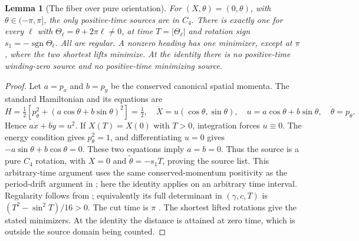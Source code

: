 \documentclass[11pt,a4paper]{article}
\newtheorem{lemma}[theorem]{Lemma}
\theoremstyle{remark}\newtheorem{remark}[theorem]{Remark}
\begin{document}
\begin{lemma}[The fiber over pure orientation]\label{lem:orientation}
For $(X,\theta)=(0,\theta)$, with $\theta\in(-\pi,\pi]$, the only
positive-time sources are in $C_4$. There is exactly one for every
$\ell$ with $\Theta_\ell=\theta+2\pi\ell\ne0$, at time
$T=|\Theta_\ell|$ and rotation sign $s_1=-\operatorname{sgn}\Theta_\ell$.
All are regular. A nonzero heading has one minimizer, except at $\pi$,
where the two shortest lifts minimize. At the identity there is no
positive-time winding-zero source and no positive-time minimizing source.
\end{lemma}
\begin{proof}
Let $a=p_x$ and $b=p_y$ be the conserved canonical spatial momenta.
The standard Hamiltonian \cite[Section 2.2]{WKB} and its equations are
\[
 H=\tfrac12[p_\theta^2+(a\cos\theta+b\sin\theta)^2]=\tfrac12,
 \quad \dot X=u(\cos\theta,\sin\theta),\quad
 u=a\cos\theta+b\sin\theta,\quad \dot\theta=p_\theta .
\]
Hence $a\dot x+b\dot y=u^2$. If $X(T)=X(0)$ with $T>0$,
integration forces $u\equiv0$. The energy condition gives
$p_\theta^2=1$, and differentiating $u=0$ gives
$-a\sin\theta+b\cos\theta=0$. These two equations imply $a=b=0$.
Thus the source is a pure $C_4$ rotation, with
$X=0$ and $\widetilde\theta=-s_1T$, proving the source list.
This arbitrary-time argument uses the same conserved-momentum
positivity as the period-drift argument in \cite[Section 2.3]{WKB};
here the identity applies on an arbitrary time interval.
Regularity follows from \cite[Theorem 2.4]{SC}; equivalently its full
determinant in $(\gamma,c,T)$ is $(T^2-\sin^2T)/16>0$.
The cut time is $\pi$ \cite[(2.4)]{SS}. The shortest lifted rotations
give the stated minimizers. At the identity the distance is attained
at zero time, which is outside the source domain being counted.
\end{proof}
\end{document}
